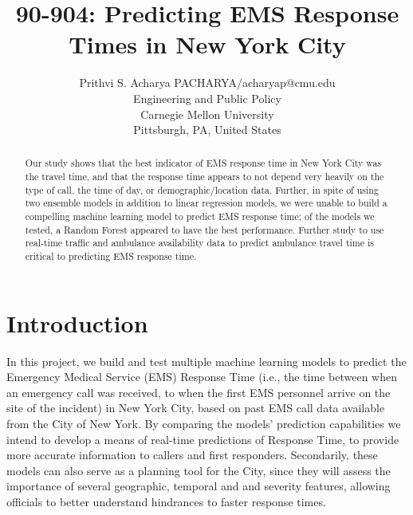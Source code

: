 \documentclass[twoside,11pt]{article}
\begin{document}
\title{90-904: Predicting EMS Response Times in New York City}

\author{\name Prithvi S. Acharya \email PACHARYA/acharyap@cmu.edu \\
       \addr Engineering and Public Policy\\
       Carnegie Mellon University\\
       Pittsburgh, PA, United States \\
       }
       
\maketitle
\begin{abstract}
    Our study shows that the best indicator of EMS response time in New York City was the travel time, and that the response time appears to not depend very heavily on the type of call, the time of day, or demographic/location data. Further, in spite of using two ensemble models in addition to linear regression models, we were unable to build a compelling machine learning model to predict EMS response time; of the models we tested, a Random Forest appeared to have the best performance. Further study to use real-time traffic and ambulance availability data to predict ambulance travel time is critical to predicting EMS response time.
\end{abstract}
\section{Introduction}
In this project, we build and test multiple machine learning models to predict the Emergency Medical Service (EMS) Response Time (i.e., the time between when an emergency call was received, to when the first EMS personnel arrive on the site of the incident) in New York City, based on past EMS call data available from the City of New York. By comparing the models' prediction capabilities we intend to develop a means of real-time predictions of Response Time, to provide more accurate information to callers and first responders. Secondarily, these models can also serve as a planning tool for the City, since they will assess the importance of several geographic, temporal and and severity features, allowing officials to better understand hindrances to faster response times. 
\end{document}
